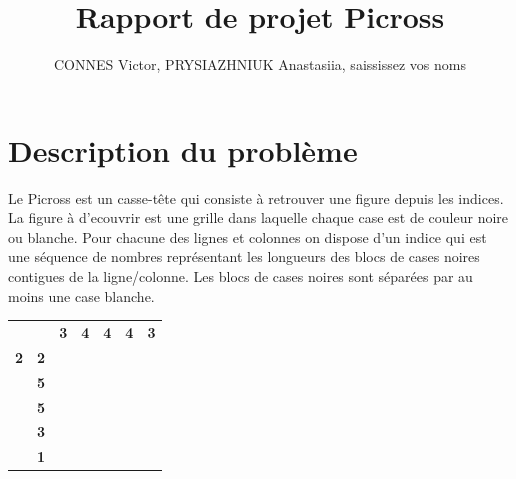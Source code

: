\documentclass{article}
\begin{document}
\title{Rapport de projet Picross}
\author{CONNES Victor, PRYSIAZHNIUK Anastasiia, saississez vos noms}
\maketitle
\tableofcontents 
\newpage
\section{Description du probl\`eme}

Le Picross est un casse-t\^ete qui consiste \`a retrouver une figure depuis les indices. La figure \`a d'ecouvrir est une grille dans laquelle chaque case est de couleur noire ou blanche. Pour chacune des lignes et colonnes on dispose d'un indice qui est une s\'equence de nombres repr\'esentant les longueurs des blocs de cases noires contigues de la ligne/colonne. Les blocs de cases noires sont s\'epar\'ees par au moins une case blanche.

\begin{table}[h]
\centering
\begin{tabular}{ccccccc}
\textbf{}  & \textbf{}                       & \textbf{3}                     & \textbf{4}                     & \textbf{4}                     & \textbf{4}                     & \textbf{3}                     \\ \cline{3-7} 
\textbf{2} & \multicolumn{1}{c|}{\textbf{2}} & \multicolumn{1}{c|}{\textbf{}} & \multicolumn{1}{c|}{\textbf{}} & \multicolumn{1}{c|}{\textbf{}} & \multicolumn{1}{c|}{\textbf{}} & \multicolumn{1}{c|}{\textbf{}} \\ \cline{3-7} 
\textbf{}  & \multicolumn{1}{c|}{\textbf{5}} & \multicolumn{1}{c|}{\textbf{}} & \multicolumn{1}{c|}{\textbf{}} & \multicolumn{1}{c|}{\textbf{}} & \multicolumn{1}{c|}{\textbf{}} & \multicolumn{1}{c|}{\textbf{}} \\ \cline{3-7} 
\textbf{}  & \multicolumn{1}{c|}{\textbf{5}} & \multicolumn{1}{c|}{\textbf{}} & \multicolumn{1}{c|}{\textbf{}} & \multicolumn{1}{c|}{\textbf{}} & \multicolumn{1}{c|}{\textbf{}} & \multicolumn{1}{c|}{\textbf{}} \\ \cline{3-7} 
\textbf{}  & \multicolumn{1}{c|}{\textbf{3}} & \multicolumn{1}{c|}{\textbf{}} & \multicolumn{1}{c|}{\textbf{}} & \multicolumn{1}{c|}{\textbf{}} & \multicolumn{1}{c|}{\textbf{}} & \multicolumn{1}{c|}{\textbf{}} \\ \cline{3-7} 
\textbf{}  & \multicolumn{1}{c|}{\textbf{1}} & \multicolumn{1}{c|}{\textbf{}} & \multicolumn{1}{c|}{\textbf{}} & \multicolumn{1}{c|}{\textbf{}} & \multicolumn{1}{c|}{\textbf{}} & \multicolumn{1}{c|}{\textbf{}} \\ \cline{3-7} 
\end{tabular}
\end{table}
\end{document}
